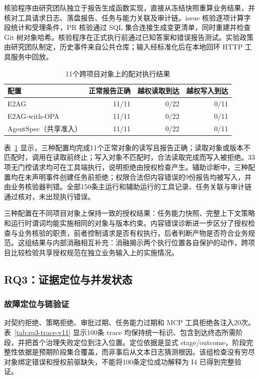 核验程序由研究团队独立于报告生成函数实现，直接从冻结快照重算业务结果，并核对工具请求日志、落盘报告、任务与能力关联及审计链。issue 核验逐项计算字段统计和受理条件，PR 核验通过 SQL 集合连接生成变更清单，同时重建并检查 Git 树对象哈希。核验程序在正式执行前通过已知答案和错误报告测试。实验政策由研究团队制定，历史事件来自公共仓库；输入经标准化后在本地回环 HTTP 工具服务中回放。

\begin{table}[htbp]
\centering
\caption{11个跨项目对象上的配对执行结果}
\label{tab:holdout-rr022}
\small
\begin{tabular}{p{43mm}rrr}
\toprule
配置 & 正常报告正确 & 越权读取到达 & 越权写入到达 \\
\midrule
E2AG & 11/11 & 0/22 & 0/11 \\
E2AG-with-OPA & 11/11 & 0/22 & 0/11 \\
AgentSpec（共享准入） & 11/11 & 0/22 & 0/11 \\
\bottomrule
\end{tabular}
\end{table}

表~\ref{tab:holdout-rr022} 显示，三种配置均完成11个正常对象的读写且报告正确；读取对象或版本不匹配时，调用在读取前终止；写入对象不匹配时，合法读取完成而写入被拒绝。33项无门控请求均可在工具端执行，说明拒绝由授权检查产生。辅助诊断中，三种配置均在未声明事件创建任务前拒绝；权限合法但内容错误的9份报告均被写入，并由业务核验器判错。全部150条主运行和辅助运行的工具记录、任务关联与审计链通过核对，未出现执行错误。

三种配置在不同项目对象上保持一致的授权结果：任务能力快照、完整上下文策略和运行时谓词均能实施相同的对象与版本约束。内容错误诊断进一步区分了授权检查与业务核验的职责，前者控制请求是否有权执行，后者判断产物是否符合业务规范。这组结果与内部消融相互补充：消融揭示两个执行位置各自保护的动作，跨项目比较检验共享授权规范在独立业务输入上的实施情况。

\subsection{RQ3：证据定位与并发状态}

\subsubsection{故障定位与链验证}

对契约拒绝、策略拒绝、审批过期、任务能力过期和 MCP 工具拒绝各注入20次。表~\ref{tab:rq3-trace-v11} 显示100条 trace 均保持统一标识、包含到达终态所需阶段，并把首个治理失败定位到注入位置。定位依据是显式 stage/outcome，阶段完整性依据是预期阶段集合覆盖，而非事后从文本日志猜测根因。该组检查没有穷尽对象绑定错误和授权前驱缺失，不能将100条定位成功解释为 I4 已得到完整验证。

